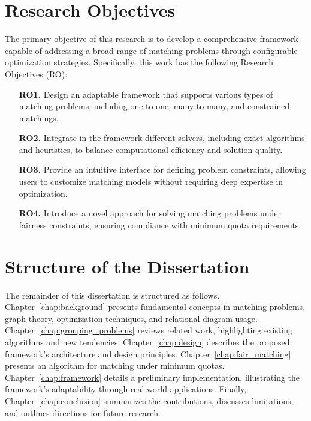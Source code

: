 \section{Research Objectives} 

The primary objective of this research is to develop a comprehensive framework capable of addressing a broad range of matching problems through configurable optimization strategies.
Specifically, this work has the following Research Objectives (RO):

\begin{itemize}
    \item[\textbf{RO1.}]\label{ro1} Design an adaptable framework that supports various types of matching problems, including one-to-one, many-to-many, and constrained matchings.
    
    \item[\textbf{RO2.}]\label{ro2} Integrate in the framework different solvers, including exact algorithms and heuristics, to balance computational efficiency and solution quality.
    
    \item[\textbf{RO3.}]\label{ro3} Provide an intuitive interface for defining problem constraints, allowing users to customize matching models without requiring deep expertise in optimization.

    \item[\textbf{RO4.}]\label{ro4} Introduce a novel approach for solving matching problems under fairness constraints, ensuring compliance with minimum quota requirements.
\end{itemize}

\section{Structure of the Dissertation}
The remainder of this dissertation is structured as follows.
%
Chapter~\ref{chap:background} presents fundamental concepts in matching problems, graph theory, optimization techniques, and relational diagram usage.
Chapter~\ref{chap:grouping_problems} reviews related work, highlighting existing algorithms and new tendencies.
Chapter~\ref{chap:design} describes the proposed framework’s architecture and design principles.
Chapter~\ref{chap:fair_matching} presents an algorithm for matching under minimum quotas.
Chapter~\ref{chap:framework} details a preliminary implementation, illustrating the framework’s adaptability through real-world applications.
Finally, Chapter~\ref{chap:conclusion} summarizes the contributions, discusses limitations, and outlines directions for future research.